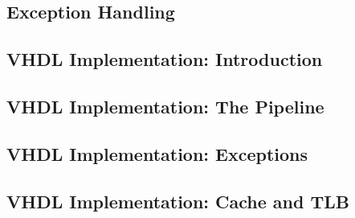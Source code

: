 \documentclass[]{scrartcl}
\begin{document}
\subsection{Exception Handling}
\subsection{VHDL Implementation: Introduction}
\subsection{VHDL Implementation: The Pipeline}
\subsection{VHDL Implementation: Exceptions}
\subsection{VHDL Implementation: Cache and TLB}
\end{document}
